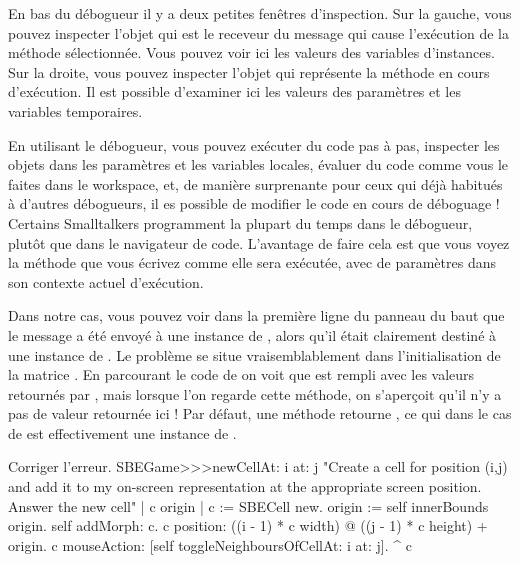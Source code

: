 \documentclass[a4paper,10pt,twoside]{book}
\begin{document}
En bas du débogueur il y a deux petites fenêtres d'inspection. Sur la gauche, vous pouvez inspecter l'objet qui est le receveur du message qui cause l'exécution de la méthode sélectionnée. Vous pouvez voir ici les valeurs des variables d'instances.
Sur la droite, vous pouvez inspecter l'objet qui représente la méthode en cours d'exécution. Il est possible d'examiner ici les valeurs des paramètres et les variables temporaires.

En utilisant le débogueur, vous pouvez exécuter du code pas à pas, inspecter les objets dans les paramètres et les variables locales, évaluer du code comme vous le faites dans le workspace, et, de manière surprenante pour ceux qui déjà habitués à d'autres débogueurs, il es possible de modifier le code en cours de déboguage ! Certains Smalltalkers programment la plupart du temps dans le débogueur, plutôt que dans le navigateur de code. L'avantage de faire cela est que vous voyez la méthode que vous écrivez comme elle sera exécutée, avec de paramètres dans son contexte actuel d'exécution.

Dans notre cas, vous pouvez voir dans la première ligne du panneau du baut que le message  a été envoyé à une instance de , alors qu'il était clairement destiné à une instance de .
Le problème se situe vraisemblablement dans l'initialisation de la matrice .
En parcourant le code de  on voit que  est rempli avec les valeurs retournés par , mais lorsque l'on regarde cette méthode, on s'aperçoit qu'il n'y a pas de valeur retournée ici !
Par défaut, une méthode retourne , ce qui dans le cas de  est effectivement une instance de .

\dothis{Fermer la fen\^etre du d\'ebogueur.
Ajouter l'expression ``\ct{^ c}'' à la fin de la méthode \ct{SBEGame>>>newCellAt:at:} de telle sorte quelle retourne \ct{c}.
(Voir \mthref{newCellAt:at:nobug}.)}

\begin{method}{Corriger l'erreur.}
SBEGame>>>newCellAt: i at: j
   "Create a cell for position (i,j) and add it to my on-screen
   representation at the appropriate screen position.  Answer the new cell"
   | c origin |
   c := SBECell new.
   origin := self innerBounds origin.
   self addMorph: c.
   c position: ((i - 1) * c width) @ ((j - 1) * c height) + origin.
   c mouseAction: [self toggleNeighboursOfCellAt: i at: j].
   ^ c
\end{method}
\end{document}
